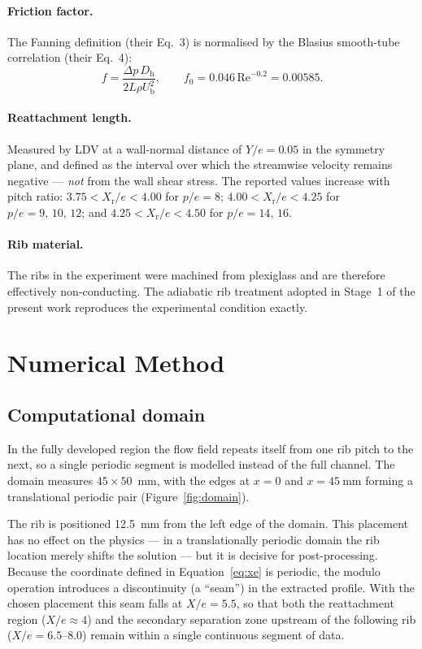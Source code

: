 \documentclass[11pt,a4paper]{article}
\newcommand{\Dh}{D_{\mathrm{h}}}
\newcommand{\Rey}{\mathrm{Re}}
\newcommand{\Xr}{X_{\mathrm{r}}}
\newcommand{\Ub}{U_{\mathrm{b}}}
\begin{document}
\paragraph{Friction factor.} The Fanning definition (their Eq.~3) is
normalised by the Blasius smooth-tube correlation (their Eq.~4):
\begin{equation}
  f = \frac{\Delta p \, \Dh}{2 L \rho \Ub^{2}}, \qquad
  f_{0} = 0.046\,\Rey^{-0.2} = 0.00585 .
  \label{eq:f0}
\end{equation}

\paragraph{Reattachment length.} Measured by LDV at a wall-normal distance
of $Y/e = 0.05$ in the symmetry plane, and defined as the interval over
which the streamwise velocity remains negative --- \emph{not} from the
wall shear stress. The reported values increase with pitch ratio:
$3.75 < \Xr/e < 4.00$ for $p/e = 8$; $4.00 < \Xr/e < 4.25$ for
$p/e = 9,\,10,\,12$; and $4.25 < \Xr/e < 4.50$ for $p/e = 14,\,16$.

\paragraph{Rib material.} The ribs in the experiment were machined from
plexiglass and are therefore effectively non-conducting. The adiabatic rib
treatment adopted in Stage~1 of the present work reproduces the
experimental condition exactly.

\section{Numerical Method}

\subsection{Computational domain}

In the fully developed region the flow field repeats itself from one rib
pitch to the next, so a single periodic segment is modelled instead of the
full channel. The domain measures $45 \times 50$~mm, with the edges at
$x = 0$ and $x = \SI{45}{\milli\meter}$ forming a translational periodic
pair (Figure~\ref{fig:domain}).

The rib is positioned \SI{12.5}{\milli\meter} from the left edge of the
domain. This placement has no effect on the physics --- in a translationally
periodic domain the rib location merely shifts the solution --- but it is
decisive for post-processing. Because the coordinate defined in
Equation~\eqref{eq:xe} is periodic, the modulo operation introduces a
discontinuity (a ``seam'') in the extracted profile. With the chosen
placement this seam falls at $X/e = 5.5$, so that both the reattachment
region ($X/e \approx 4$) and the secondary separation zone upstream of the
following rib ($X/e = 6.5$--$8.0$) remain within a single continuous
segment of data.
\end{document}
